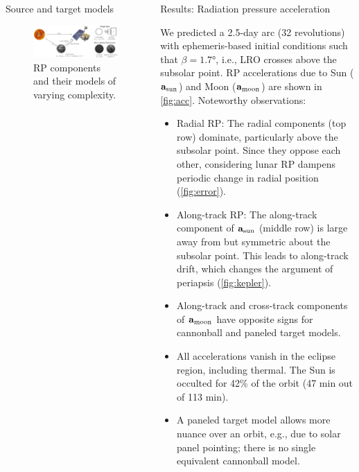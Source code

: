 \documentclass[final,20pt]{beamer}
\begin{document}
\begin{frame}[t]
\begin{columns}[t]
\begin{column}{\colwidth}
\begin{block}{Source and target models}
    \begin{figure}[b]
      \centering
      \includegraphics[width=\linewidth]{models.pdf}
      \caption{RP components and their models of varying complexity.}
      \label{fig:models}
    \end{figure}

  \end{block}

\end{column}

\separatorcolumn

\begin{column}{\colwidth}

  \begin{block}{Results: Radiation pressure acceleration}

    We predicted a 2.5-day arc (32 revolutions) with ephemeris-based initial conditions such that $\beta = \ang{1.7}$, i.e., LRO crosses above the subsolar point. RP accelerations due to Sun ($\vb a_\text{sun}$) and Moon ($\vb a_\text{moon}$) are shown in \cref{fig:acc}. Noteworthy observations:
    \begin{itemize}
      \item Radial RP: The radial components (top row) dominate, particularly above the subsolar point. Since they oppose each other, considering lunar RP dampens periodic change in radial position (\cref{fig:error}).
      \item Along-track RP: The along-track component of $\vb a_\text{sun}$ (middle row) is large away from but symmetric about the subsolar point. This leads to along-track drift, which changes the argument of periapsis (\cref{fig:kepler}).
      \item Along-track and cross-track components of $\vb a_\text{moon}$ have opposite signs for cannonball and paneled target models.
      \item All accelerations vanish in the eclipse region, including thermal. The Sun is occulted for 42\% of the orbit (47 min out of 113 min).
      \item A paneled target model allows more nuance over an orbit, e.g., due to solar panel pointing; there is no single equivalent cannonball model.
    \end{itemize}


\end{block}
\end{column}
\end{columns}
\end{frame}
\end{document}

